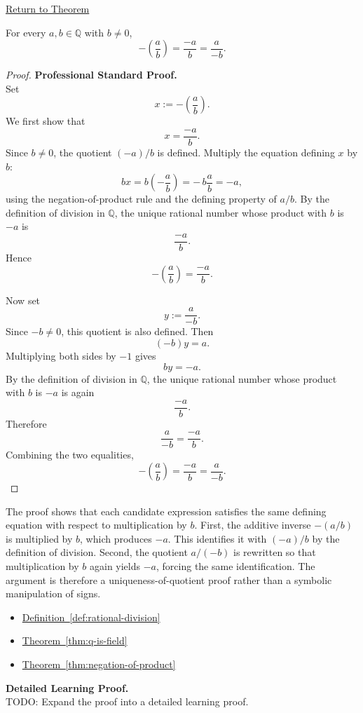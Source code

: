 \newpage
{}
\label{prf:rational-fraction-negation}

\begin{remark*}[Return]
\hyperref[thm:rational-fraction-negation]{Return to Theorem}
\end{remark*}

\begin{theorem*}
For every $a,b\in\mathbb{Q}$ with $b\neq 0$,
\[
-\left(\frac{a}{b}\right)
=
\frac{-a}{b}
=
\frac{a}{-b}.
\]
\end{theorem*}

\begin{proof}
\textbf{Professional Standard Proof.}~\\
Set
\[
x:=-\left(\frac{a}{b}\right).
\]
We first show that
\[
x=\frac{-a}{b}.
\]
Since $b\neq 0$, the quotient $(-a)/b$ is defined.  Multiply the equation
defining $x$ by $b$:
\[
bx=b\left(-\frac{a}{b}\right)=-\,b\frac{a}{b}=-a,
\]
using the negation-of-product rule and the defining property of
$a/b$.  By the definition of division in $\mathbb{Q}$, the unique rational
number whose product with $b$ is $-a$ is
\[
\frac{-a}{b}.
\]
Hence
\[
-\left(\frac{a}{b}\right)=\frac{-a}{b}.
\]

Now set
\[
y:=\frac{a}{-b}.
\]
Since $-b\neq 0$, this quotient is also defined.  Then
\[
(-b)y=a.
\]
Multiplying both sides by $-1$ gives
\[
by=-a.
\]
By the definition of division in $\mathbb{Q}$, the unique rational number
whose product with $b$ is $-a$ is again
\[
\frac{-a}{b}.
\]
Therefore
\[
\frac{a}{-b}=\frac{-a}{b}.
\]
Combining the two equalities,
\[
-\left(\frac{a}{b}\right)=\frac{-a}{b}=\frac{a}{-b}.
\]
\end{proof}

\begin{remark*}
The proof shows that each candidate expression satisfies the same defining
equation with respect to multiplication by $b$.  First, the additive inverse
$-(a/b)$ is multiplied by $b$, which produces $-a$.  This identifies it with
$(-a)/b$ by the definition of division.  Second, the quotient $a/(-b)$ is
rewritten so that multiplication by $b$ again yields $-a$, forcing the same
identification.  The argument is therefore a uniqueness-of-quotient proof
rather than a symbolic manipulation of signs.
\end{remark*}

\begin{dependencies}
\begin{itemize}
  \item \hyperref[def:rational-division]{Definition~\ref*{def:rational-division}}
  \item \hyperref[thm:q-is-field]{Theorem~\ref*{thm:q-is-field}}
  \item \hyperref[thm:negation-of-product]{Theorem~\ref*{thm:negation-of-product}}
\end{itemize}
\end{dependencies}

\textbf{Detailed Learning Proof.}~\\
TODO: Expand the proof into a detailed learning proof.

